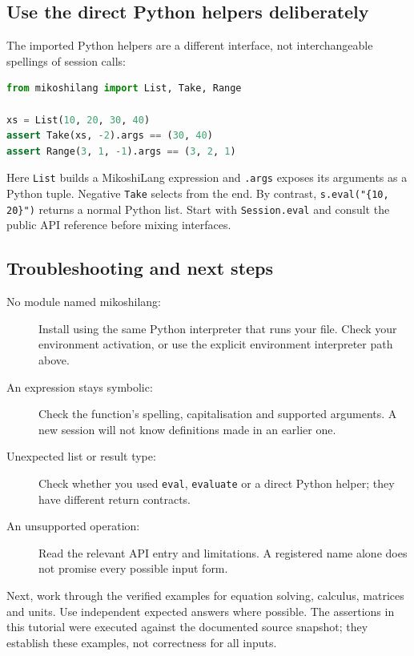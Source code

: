 \subsection{Use the direct Python helpers deliberately}
The imported Python helpers are a different interface, not interchangeable spellings of session calls:
\begin{lstlisting}[language=Python]
from mikoshilang import List, Take, Range

xs = List(10, 20, 30, 40)
assert Take(xs, -2).args == (30, 40)
assert Range(3, 1, -1).args == (3, 2, 1)
\end{lstlisting}
Here \texttt{List} builds a MikoshiLang expression and \texttt{.args} exposes its arguments as a Python tuple. Negative \texttt{Take} selects from the end. By contrast, \texttt{s.eval("\{10, 20\}")} returns a normal Python list. Start with \texttt{Session.eval} and consult the public API reference before mixing interfaces.

\subsection{Troubleshooting and next steps}
\begin{description}
\item[No module named mikoshilang:] Install using the same Python interpreter that runs your file. Check your environment activation, or use the explicit environment interpreter path above.
\item[An expression stays symbolic:] Check the function's spelling, capitalisation and supported arguments. A new session will not know definitions made in an earlier one.
\item[Unexpected list or result type:] Check whether you used \texttt{eval}, \texttt{evaluate} or a direct Python helper; they have different return contracts.
\item[An unsupported operation:] Read the relevant API entry and limitations. A registered name alone does not promise every possible input form.
\end{description}
Next, work through the verified examples for equation solving, calculus, matrices and units. Use independent expected answers where possible. The assertions in this tutorial were executed against the documented source snapshot; they establish these examples, not correctness for all inputs.
\clearpage
